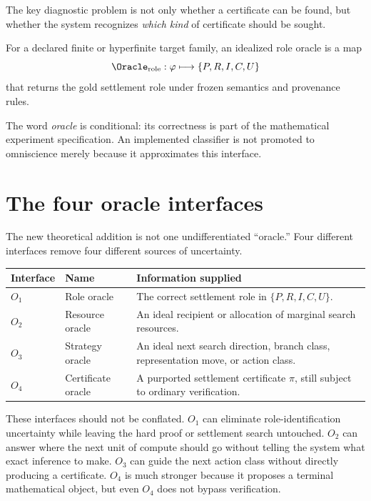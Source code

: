 The key diagnostic problem is not only whether a certificate can be found, but whether the system recognizes \emph{which kind} of certificate should be sought.

\begin{definition}
For a declared finite or hyperfinite target family, an idealized role oracle is a map
\begin{equation}
\Oracle_{\mathrm{role}}:\varphi\longmapsto \{P,R,I,C,U\}
\end{equation}
that returns the gold settlement role under frozen semantics and provenance rules.
\end{definition}

The word \emph{oracle} is conditional: its correctness is part of the mathematical experiment specification. An implemented classifier is not promoted to omniscience merely because it approximates this interface.

\section{The four oracle interfaces}

The new theoretical addition is not one undifferentiated ``oracle.'' Four different interfaces remove four different sources of uncertainty.

\begin{center}
\begin{tabular}{p{}p{}p{}}
\toprule
Interface & Name & Information supplied \\
\midrule
$O_1$ & Role oracle & The correct settlement role in $\{P,R,I,C,U\}$. \\
$O_2$ & Resource oracle & An ideal recipient or allocation of marginal search resources. \\
$O_3$ & Strategy oracle & An ideal next search direction, branch class, representation move, or action class. \\
$O_4$ & Certificate oracle & A purported settlement certificate $\pi$, still subject to ordinary verification. \\
\bottomrule
\end{tabular}
\end{center}

These interfaces should not be conflated. $O_1$ can eliminate role-identification uncertainty while leaving the hard proof or settlement search untouched. $O_2$ can answer where the next unit of compute should go without telling the system what exact inference to make. $O_3$ can guide the next action class without directly producing a certificate. $O_4$ is much stronger because it proposes a terminal mathematical object, but even $O_4$ does not bypass verification.

